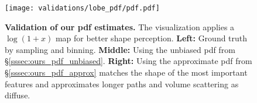 \begin{figure}[t]
	\centering
	\texttt{[image: validations/lobe\_pdf/pdf.pdf]}
	\caption{\textbf{Validation of our pdf estimates.} The visualization applies a $\log(1+x)$ map for better shape perception. \textbf{Left:} Ground truth by sampling and binning. \textbf{Middle:} Using the unbiased pdf from \S\ref{sssec:ours_pdf_unbiased}. \textbf{Right:} Using the approximate pdf from \S\ref{sssec:ours_pdf_approx} matches the shape of the most important features and approximates longer paths and volume scattering as diffuse.}
	\label{fig:pdf-validate}
\end{figure}
